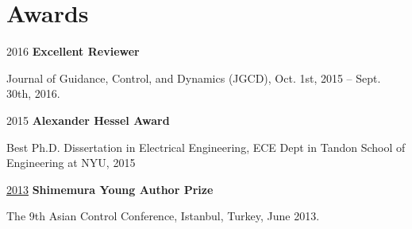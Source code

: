    \section{Awards}
       
        \begin{twocolentry}{2016}
            \textbf{Excellent Reviewer}\end{twocolentry}
        \vspace{0.10 cm}
        \begin{onecolentry}
            \begin{highlights}
                \item Journal of Guidance, Control, and Dynamics (JGCD), Oct. 1st, 2015 – Sept. 30th, 2016.
            \end{highlights}
        \end{onecolentry}
        \vspace{0.20 cm}
        
        \begin{twocolentry}{2015}
            \textbf{Alexander Hessel Award}\end{twocolentry}
        \vspace{0.10 cm}
        \begin{onecolentry}
            \begin{highlights}
                \item Best Ph.D. Dissertation in Electrical Engineering, ECE Dept in Tandon School of Engineering at NYU, 2015
            \end{highlights}
        \end{onecolentry}
        \vspace{0.20 cm}
        
        \begin{twocolentry}{\href{http://acacontrol.org/awards/shimemura-young-author-prize/}{2013}}
        \textbf{Shimemura Young Author Prize}\end{twocolentry}
        \vspace{0.10 cm}
        \begin{onecolentry}
            \begin{highlights}
                \item The 9th Asian Control Conference, Istanbul, Turkey, June 2013.
            \end{highlights}
        \end{onecolentry}
        \vspace{0.20 cm}
        
